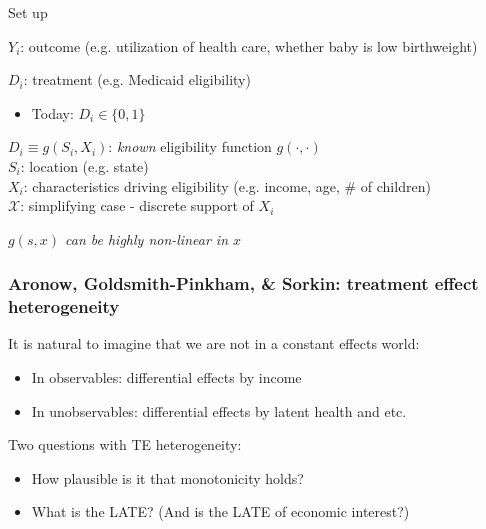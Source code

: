 \documentclass[notes,11pt, aspectratio=169]{beamer}
\newenvironment{wideitemize}{\itemize\addtolength{\itemsep}{10pt}}{\enditemize}
\begin{document}
\begin{frame}{Set up}
\begin{wideitemize}
\item $Y_{i}$: outcome (e.g. utilization of health care, whether baby is low birthweight)
\item $D_{i}$: treatment (e.g. Medicaid eligibility)
  \begin{itemize}
  \item Today: $D_{i} \in \{0,1\}$ 
  \end{itemize}
\item $D_{i} \equiv g(S_{i}, X_{i})$: \emph{known} eligibility function $g(\cdot, \cdot)$\\
  \hspace{10pt} $S_{i}$: location  (e.g. state)\\
  \hspace{10pt} $X_{i}$: characteristics driving eligibility (e.g. income, age, \# of children)\\
  \hspace{10pt} $\mathcal{X}$: simplifying case - discrete support of $X_{i}$\\  
\item \emph{$g(s,x)$ can be highly non-linear in $x$}
\end{wideitemize}
\end{frame}

\begin{frame}
\frametitle{Aronow, Goldsmith-Pinkham, \& Sorkin: treatment effect heterogeneity}

It is natural to imagine that we are not in a constant effects world:
\begin{itemize}
\item In observables: differential effects by income
\item In unobservables: differential effects by latent health and etc.
\end{itemize} 
Two questions with TE heterogeneity:
\begin{itemize}
\item How plausible is it that monotonicity holds?  
\item What is the LATE? (And is the LATE of economic interest?) 
\end{itemize}

\end{frame}
\end{document}
